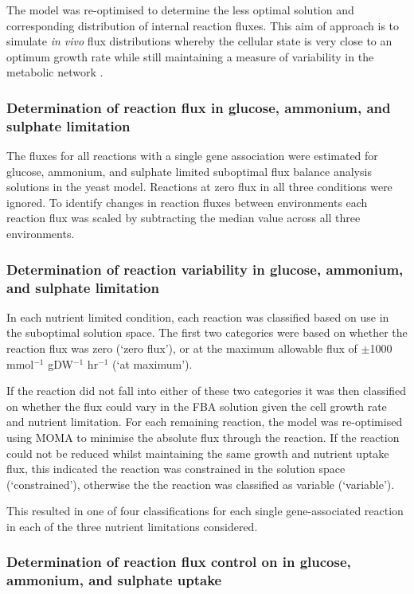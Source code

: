 The model was re-optimised to determine the less optimal solution and corresponding distribution of internal reaction fluxes. This aim of approach is to simulate \emph{in vivo} flux distributions whereby the cellular state is very close to an optimum growth rate while still maintaining a measure of variability in the metabolic network \cite{mahadevan2003}.

\subsubsection{Determination of reaction flux in glucose, ammonium, and sulphate limitation}

The fluxes for all reactions with a single gene association were estimated for glucose, ammonium, and sulphate limited suboptimal flux balance analysis solutions in the yeast model. Reactions at zero flux in all three conditions were ignored. To identify changes in reaction fluxes between environments each reaction flux was scaled by subtracting the median value across all three environments.

\subsubsection{Determination of reaction variability in glucose, ammonium, and sulphate limitation}

In each nutrient limited condition, each reaction was classified based on use in the suboptimal solution space.  The first two categories were based on whether the reaction flux was zero (`zero flux'), or at the maximum allowable flux of $\pm$1000 mmol$^{-1}$ gDW$^{-1}$ hr$^{-1}$ (`at maximum').

If the reaction did not fall into either of these two categories it was then classified on whether the flux could vary in the FBA solution given the cell growth rate and nutrient limitation. For each remaining reaction, the model was re-optimised using MOMA to minimise the absolute flux through the reaction. If the reaction could not be reduced whilst maintaining the same growth and nutrient uptake flux, this indicated the reaction was constrained in the solution space (`constrained'), otherwise the the reaction was classified as variable (`variable').

This resulted in one of four classifications for each single gene-associated reaction in each of the three nutrient limitations considered.

\subsubsection{Determination of reaction flux control on in glucose, ammonium, and sulphate uptake}

